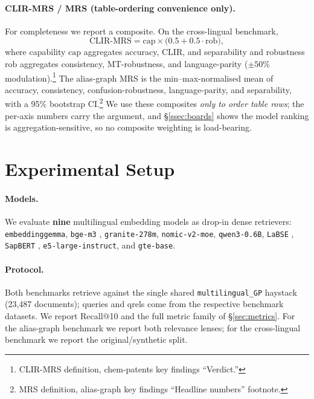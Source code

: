 \documentclass[11pt]{article}
\begin{document}
\paragraph{CLIR-MRS / MRS (table-ordering convenience only).}
For completeness we report a composite. On the cross-lingual benchmark,
\begin{equation}
\label{eq:clirmrs}
\mathrm{CLIR\text{-}MRS} = \mathrm{cap} \times \bigl(0.5 + 0.5\cdot\mathrm{rob}\bigr),
\end{equation}
where capability $\mathrm{cap}$ aggregates accuracy, CLIR, and separability and
robustness $\mathrm{rob}$ aggregates consistency, MT-robustness, and
language-parity ($\pm50\%$ modulation).\footnote{CLIR-MRS definition,
chem-patents key findings ``Verdict.''} The alias-graph MRS is the
min--max-normalised mean of accuracy, consistency, confusion-robustness,
language-parity, and separability, with a 95\% bootstrap CI.\footnote{MRS
definition, alias-graph key findings ``Headline numbers'' footnote.} We use
these composites \emph{only to order table rows}; the per-axis numbers carry the
argument, and \S\ref{ssec:boards} shows the model ranking is aggregation-sensitive,
so no composite weighting is load-bearing.

\section{Experimental Setup}
\label{sec:setup}

\paragraph{Models.}
We evaluate \textbf{nine} multilingual embedding models as drop-in dense
retrievers: \texttt{embeddinggemma}, \texttt{bge-m3} \citep{bgem3_2024},
\texttt{granite-278m}, \texttt{nomic-v2-moe}, \texttt{qwen3-0.6B},
\texttt{LaBSE} \citep{labse2022}, \texttt{SapBERT} \citep{sapbert2021},
\texttt{e5-large-instruct}, and \texttt{gte-base}.

\paragraph{Protocol.}
Both benchmarks retrieve against the single shared \texttt{multilingual\_GP}
haystack (23{,}487 documents); queries and qrels come from the respective
benchmark datasets. We report Recall@10 and the full metric family of
\S\ref{sec:metrics}. For the alias-graph benchmark we report both relevance
lenses; for the cross-lingual benchmark we report the original/synthetic split.
\end{document}
